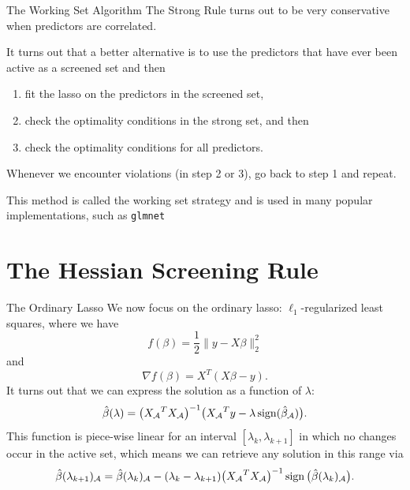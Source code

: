 \documentclass[10pt,ignorenonframetext]{beamer}
\begin{document}
\begin{frame}{The Working Set Algorithm}
  The Strong Rule turns out to be very conservative when predictors are
  correlated. \medskip

  It turns out that a better alternative is to use the predictors that have
  \alert{ever been active} as a screened set and then
  \begin{enumerate}
    \item fit the lasso on the predictors in the screened set,
    \item check the optimality conditions in the strong set, and then
    \item check the optimality conditions for all predictors.
  \end{enumerate}
  Whenever we encounter violations (in step 2 or 3), go back to step 1 and
  repeat.

  \medskip

  This method is called the \alert{working set strategy} and is used in many
  popular implementations, such as \texttt{glmnet}~\parencite{friedman2010}
\end{frame}

\section{The Hessian Screening Rule}

\begin{frame}{The Ordinary Lasso}
  We now focus on the ordinary lasso: \(\ell_1\)-regularized least
  squares, where we have
  \[
    f(\beta) = \frac 1 2 \lVert y - X\beta \rVert_2^2
  \]
  and
  \[
    \nabla f(\beta) = X^T(X\beta - y).
  \]
  \pause
  It turns out that we can express the solution as a function of
  \(\lambda\):
  \begin{equation*}
    \label{eq:solution}
    \hat\beta(\lambda) = \big({X_\mathcal{A}}^TX_\mathcal{A}\big)^{-1}
    \big({X_\mathcal{A}}^Ty - \lambda \operatorname{sign}(\hat\beta_\mathcal{A})\big).
  \end{equation*}
  \pause
  This function is piece-wise linear
  for an interval \([\lambda_k,\lambda_{k+1}]\) in which no changes occur in
  the active set, which means we can retrieve any solution in this range via
  \begin{equation*}
    \hat\beta(\lambda_{k+1})_\mathcal{A} =
    \hat\beta(\lambda_k)_\mathcal{A} -
    (\lambda_k - \lambda_{k+1})\big({X_\mathcal{A}}^TX_\mathcal{A}\big)^{-1}
    \operatorname{sign}\big(\hat\beta(\lambda_k)_\mathcal{A}\big).
  \end{equation*}
\end{frame}
\end{document}
